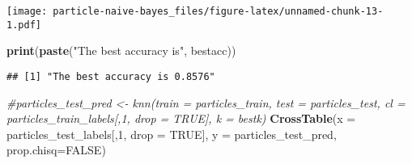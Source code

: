 \documentclass[
]{article}
\newenvironment{Shaded}{\begin{snugshade}}{\end{snugshade}}
\newcommand{\CommentTok}[1]{\textcolor[rgb]{0.56,0.35,0.01}{\textit{#1}}}
\newcommand{\DataTypeTok}[1]{\textcolor[rgb]{0.13,0.29,0.53}{#1}}
\newcommand{\DecValTok}[1]{\textcolor[rgb]{0.00,0.00,0.81}{#1}}
\newcommand{\KeywordTok}[1]{\textcolor[rgb]{0.13,0.29,0.53}{\textbf{#1}}}
\newcommand{\NormalTok}[1]{#1}
\newcommand{\OtherTok}[1]{\textcolor[rgb]{0.56,0.35,0.01}{#1}}
\newcommand{\StringTok}[1]{\textcolor[rgb]{0.31,0.60,0.02}{#1}}
\begin{document}
\texttt{[image: particle-naive-bayes\_files/figure-latex/unnamed-chunk-13-1.pdf]}

\begin{Shaded}
\begin{Highlighting}[]
\KeywordTok{print}\NormalTok{(}\KeywordTok{paste}\NormalTok{(}\StringTok{"The best accuracy is"}\NormalTok{, bestacc))}
\end{Highlighting}
\end{Shaded}

\begin{verbatim}
## [1] "The best accuracy is 0.8576"
\end{verbatim}

\begin{Shaded}
\begin{Highlighting}[]
\CommentTok{#particles_test_pred <- knn(train = particles_train, test = particles_test, cl = particles_train_labels[,1, drop = TRUE], k = bestk)}
\KeywordTok{CrossTable}\NormalTok{(}\DataTypeTok{x =}\NormalTok{ particles_test_labels[,}\DecValTok{1}\NormalTok{, }\DataTypeTok{drop =} \OtherTok{TRUE}\NormalTok{], }\DataTypeTok{y =}\NormalTok{ particles_test_pred, }\DataTypeTok{prop.chisq=}\OtherTok{FALSE}\NormalTok{)}
\end{Highlighting}
\end{Shaded}
\end{document}
